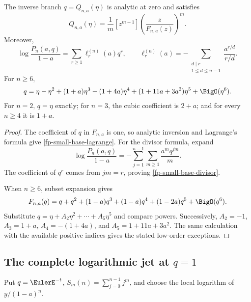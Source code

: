 \begin{theorem}[Exact coefficient engine at \(q=0\)]
\label{fp-small-base-engine}
The inverse branch \(q=Q_{n,a}(\eta)\) is analytic at zero and satisfies
\begin{equation}
 [\eta^m]Q_{n,a}(\eta)=\frac1m[z^{m-1}]
 \left(\frac{z}{F_{n,a}(z)}\right)^m.
 \label{fp-small-base-lagrange}
\end{equation}
Moreover,
\begin{equation}
 \log\frac{P_n(a,q)}{1-a}=\sum_{r\geq1}\ell_r^{(n)}(a)q^r,\qquad
 \ell_r^{(n)}(a)=
 -\sum_{\substack{d\mid r\\1\leq d\leq n-1}}
 \frac{a^{r/d}}{r/d}.
 \label{fp-small-base-divisor}
\end{equation}
For \(n\geq6\),
\begin{equation}
 q=\eta-\eta^2+(1+a)\eta^3-(1+4a)\eta^4
 +(1+11a+3a^2)\eta^5+\BigO(\eta^6).
 \label{fp-small-base-five}
\end{equation}
For \(n=2\), \(q=\eta\) exactly; for \(n=3\), the cubic coefficient is
\(2+a\); and for every \(n\geq4\) it is \(1+a\).
\end{theorem}

\begin{proof}
The coefficient of \(q\) in \(F_{n,a}\) is one, so analytic inversion and
Lagrange's formula give \cref{fp-small-base-lagrange}.  For the divisor
formula, expand
\[
 \log\frac{P_n(a,q)}{1-a}
 =-\sum_{j=1}^{n-1}\sum_{m\geq1}\frac{a^mq^{jm}}m.
\]
The coefficient of \(q^r\) comes from \(jm=r\), proving
\cref{fp-small-base-divisor}.

When \(n\geq6\), subset expansion gives
\[
 F_{n,a}(q)=q+q^2+(1-a)q^3+(1-a)q^4+(1-2a)q^5+\BigO(q^6).
\]
Substitute \(q=\eta+A_2\eta^2+\cdots+A_5\eta^5\) and compare powers.
Successively,
\(A_2=-1\), \(A_3=1+a\), \(A_4=-(1+4a)\), and
\(A_5=1+11a+3a^2\).  The same calculation with the available positive
indices gives the stated low-order exceptions.
\end{proof}

\subsection{\texorpdfstring{The complete logarithmic jet at \(q=1\)}{The complete logarithmic jet at q=1}}

Put \(q=\EulerE^{-t}\), \(S_m(n)=\sum_{j=0}^{n-1}j^m\), and choose the local
logarithm of \(y/(1-a)^n\).

